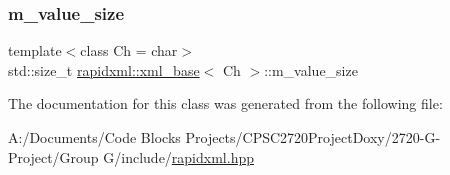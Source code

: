 \mbox{\label{classrapidxml_1_1xml__base_aa3a49d8ceddb8a8d7edb773a2226b89c}} 
\subsubsection{\texorpdfstring{m\+\_\+value\+\_\+size}{m\_value\_size}}
{\footnotesize\ttfamily template$<$class Ch  = char$>$ \\
std\+::size\+\_\+t \mbox{\hyperlink{classrapidxml_1_1xml__base}{rapidxml\+::xml\+\_\+base}}$<$ Ch $>$\+::m\+\_\+value\+\_\+size\hspace{0.3cm}{\ttfamily [protected]}}



The documentation for this class was generated from the following file\+:\begin{DoxyCompactItemize}
\item 
A\+:/\+Documents/\+Code Blocks Projects/\+C\+P\+S\+C2720\+Project\+Doxy/2720-\/\+G-\/\+Project/\+Group G/include/\mbox{\hyperlink{include_2rapidxml_8hpp}{rapidxml.\+hpp}}\end{DoxyCompactItemize}
